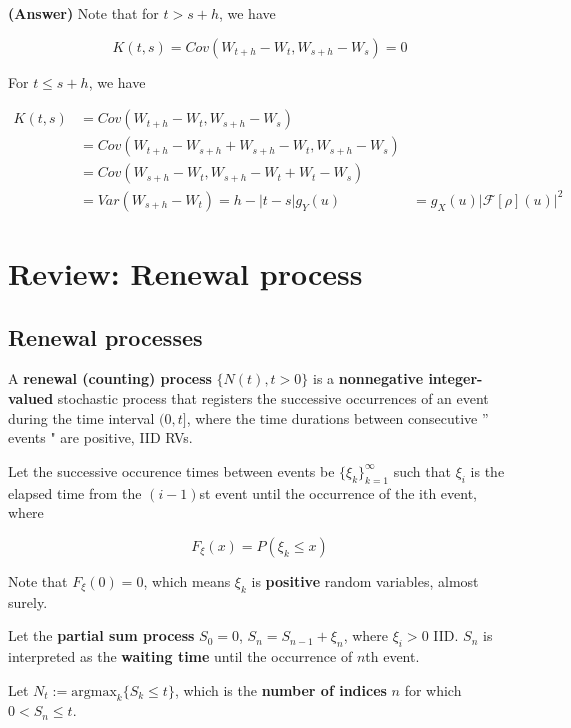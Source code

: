 \documentclass[12pt]{article}
\theoremstyle{nonumberbreak}
\begin{document}
\textbf{(Answer)} Note that for $t > s + h$, we have

$$
K(t,s) = Cov(W_{t+h} - W_t, W_{s+h} - W_s) = 0
$$

For $t \le s + h$, we have

$$
\begin{aligned}
K(t,s) &= Cov(W_{t+h} - W_t, W_{s+h} - W_s) \\[8pt]
&= Cov(W_{t+h} - W_{s+h} + W_{s+h} - W_t, W_{s+h} - W_s) \\[8pt]
&= Cov(W_{s+h} - W_t, W_{s+h} - W_t + W_t - W_s) \\[8pt]
&= Var(W_{s+h} - W_t) = h - |t - s|
g_Y(u) &= g_X(u) |\mathcal{F}[\rho] (u)|^2
\end{aligned}
$$







\section*{Review: Renewal process}

\subsection*{Renewal processes}

A \textbf{renewal (counting) process} $\{N(t), t > 0\}$ is a \textbf{nonnegative integer-valued} stochastic process that registers the successive occurrences of an event during the time interval $(0, t]$, where the time durations between consecutive '' events " are positive, IID RVs. 

Let the successive occurence times between
events be $\{\xi_k\}_{k=1}^\infty$ such that $\xi_i$ is the elapsed time from the $(i-1)$st event until the occurrence of the ith event, where

$$
F_\xi (x) = P(\xi_k \le x)
$$

Note that $F_\xi(0) = 0$, which means $\xi_k$ is \textbf{positive} random variables, almost surely. 

Let the \textbf{partial sum process} $S_0 = 0$, $S_n = S_{n-1} + \xi_n$, where $\xi_i >0$ IID. $S_n$ is interpreted as the \textbf{waiting time} until the occurrence of $n$th event. 


Let $N_t := \mathrm{argmax}_k \{S_k \le t\}$, which is the \textbf{number of indices} $n$ for which $0 < S_n \le t$. 
\end{document}
